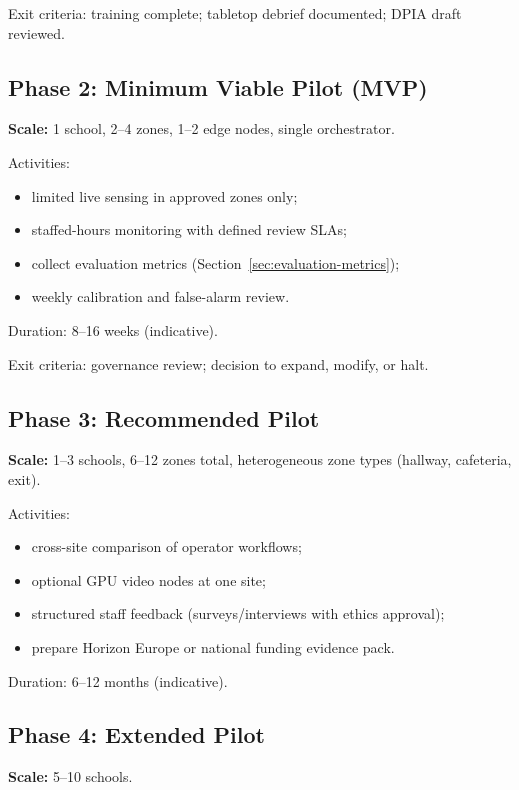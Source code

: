 Exit criteria: training complete; tabletop debrief documented; DPIA draft reviewed.

\subsection{Phase 2: Minimum Viable Pilot (MVP)}

\textbf{Scale:} 1 school, 2--4 zones, 1--2 edge nodes, single orchestrator.

Activities:
\begin{itemize}[noitemsep]
  \item limited live sensing in approved zones only;
  \item staffed-hours monitoring with defined review SLAs;
  \item collect evaluation metrics (Section~\ref{sec:evaluation-metrics});
  \item weekly calibration and false-alarm review.
\end{itemize}

Duration: 8--16 weeks (indicative).

Exit criteria: governance review; decision to expand, modify, or halt.

\subsection{Phase 3: Recommended Pilot}

\textbf{Scale:} 1--3 schools, 6--12 zones total, heterogeneous zone types (hallway, cafeteria, exit).

Activities:
\begin{itemize}[noitemsep]
  \item cross-site comparison of operator workflows;
  \item optional GPU video nodes at one site;
  \item structured staff feedback (surveys/interviews with ethics approval);
  \item prepare Horizon Europe or national funding evidence pack.
\end{itemize}

Duration: 6--12 months (indicative).

\subsection{Phase 4: Extended Pilot}

\textbf{Scale:} 5--10 schools.

